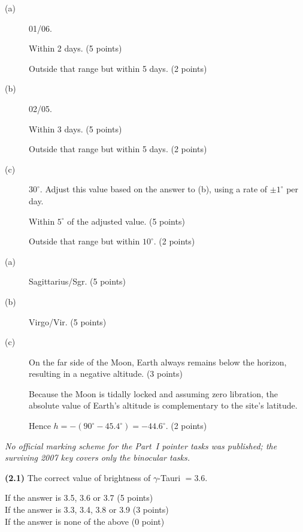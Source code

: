 \begin{description}
\item[(a)] 01/06.

  Within 2 days. \hfill(5 points)

  Outside that range but within 5 days. \hfill(2 points)

\item[(b)] 02/05.

  Within 3 days. \hfill(5 points)

  Outside that range but within 5 days. \hfill(2 points)

\item[(c)] $30^\circ$. Adjust this value based on the answer to (b), using
  a rate of $\pm 1^\circ$ per day.

  Within $5^\circ$ of the adjusted value. \hfill(5 points)

  Outside that range but within $10^\circ$. \hfill(2 points)
\end{description}

\begin{description}
\item[(a)] Sagittarius/Sgr. \hfill(5 points)

\item[(b)] Virgo/Vir. \hfill(5 points)

\item[(c)] On the far side of the Moon, Earth always remains below the
  horizon, resulting in a negative altitude. \hfill(3 points)

  Because the Moon is tidally locked and assuming zero libration, the
  absolute value of Earth's altitude is complementary to the site's latitude.

  Hence $h = -(90^\circ - 45.4^\circ) = -44.6^\circ$. \hfill(2 points)
\end{description}

\textit{No official marking scheme for the Part~I pointer tasks was published; the surviving 2007 key covers only the binocular tasks.}

\textbf{(2.1)} The correct value of brightness of $\gamma$-Tauri $= 3.6$.

If the answer is 3.5, 3.6 or 3.7 \hfill(5 points)\\
If the answer is 3.3, 3.4, 3.8 or 3.9 \hfill(3 points)\\
If the answer is none of the above \hfill(0 point)

